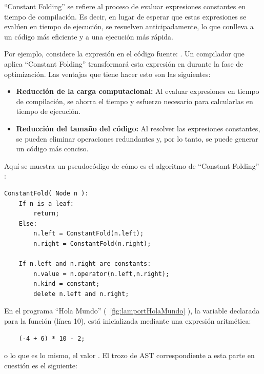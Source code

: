\vspace{0.5cm}
``Constant Folding'' se refiere al proceso de evaluar expresiones constantes en tiempo de compilación. Es decir, en lugar de esperar que estas expresiones se evalúen en tiempo de ejecución, se resuelven anticipadamente, lo que conlleva a un código más eficiente y a una ejecución más rápida.

\vspace{0.5cm}
Por ejemplo, considere la expresión en el código fuente: . Un compilador que aplica ``Constant Folding'' transformará esta expresión en  durante la fase de optimización. Las ventajas que tiene hacer esto son las siguientes:

\begin{itemize}
    \item \textbf{Reducción de la carga computacional:} Al evaluar expresiones en tiempo de compilación, se ahorra el tiempo y esfuerzo necesario para calcularlas en tiempo de ejecución.
    \item \textbf{Reducción del tamaño del código:} Al resolver las expresiones constantes, se pueden eliminar operaciones redundantes y, por lo tanto, se puede generar un código más conciso.
\end{itemize}

\vspace{0.5cm}
\noindent
Aquí se muestra un pseudocódigo de cómo es el algoritmo de ``Constant Folding'' \cite[Capítulo 8]{thain2020introduction}:
\begin{verbatim}
ConstantFold( Node n ):
    If n is a leaf:
        return;
    Else:
        n.left = ConstantFold(n.left);
        n.right = ConstantFold(n.right);
    
    If n.left and n.right are constants:
        n.value = n.operator(n.left,n.right);
        n.kind = constant;
        delete n.left and n.right;
\end{verbatim}

En el programa ``Hola Mundo'' (~\ref{fig:lamportHolaMundo} ), la variable  declarada para la función  (línea 10), está inicializada mediante una expresión aritmética: \begin{verbatim}
    (-4 + 6) * 10 - 2;
\end{verbatim}

o lo que es lo mismo, el valor . El trozo de AST correspondiente a esta parte en cuestión es el siguiente:

